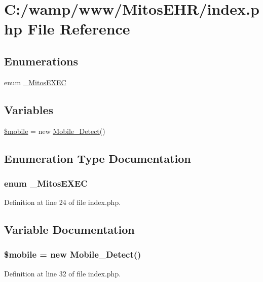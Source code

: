 \hypertarget{index_8php}{\section{\-C\-:/wamp/www/\-Mitos\-E\-H\-R/index.php \-File \-Reference}
\label{index_8php}
}
\subsection*{\-Enumerations}
\begin{DoxyCompactItemize}
\item 
enum \hyperlink{index_8php_a647561675b3f1dae136772a1bc2a5ae5}{\-\_\-\-Mitos\-E\-X\-E\-C} 
\end{DoxyCompactItemize}
\subsection*{\-Variables}
\begin{DoxyCompactItemize}
\item 
\hyperlink{index_8php_a4144d0c9c54f204811328b221f06fc3d}{\$mobile} = new \hyperlink{class_mobile___detect}{\-Mobile\-\_\-\-Detect}()
\end{DoxyCompactItemize}


\subsection{\-Enumeration \-Type \-Documentation}
\hypertarget{index_8php_a647561675b3f1dae136772a1bc2a5ae5}{
\subsubsection[{\-\_\-\-Mitos\-E\-X\-E\-C}]{\setlength{\rightskip}{0pt plus 5cm}enum {\bf \-\_\-\-Mitos\-E\-X\-E\-C}}}\label{index_8php_a647561675b3f1dae136772a1bc2a5ae5}


\-Definition at line 24 of file index.\-php.



\subsection{\-Variable \-Documentation}
\hypertarget{index_8php_a4144d0c9c54f204811328b221f06fc3d}{
\subsubsection[{\$mobile}]{\setlength{\rightskip}{0pt plus 5cm}\$mobile = new {\bf \-Mobile\-\_\-\-Detect}()}}\label{index_8php_a4144d0c9c54f204811328b221f06fc3d}


\-Definition at line 32 of file index.\-php.

